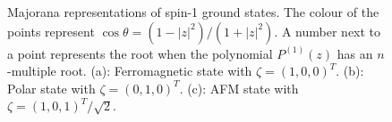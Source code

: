 \begin{figure}
    \centering
    \caption[Majorana representation of spin-1 ground states]
    {\label{fig: spin-1-majorana}Majorana representations of spin-1 ground
    states. The colour of the points represent \(\cos\theta =
    (1-|z|^2)/(1+|z|^2)\).
    A number next to a point represents the root when the polynomial
    \(P^{(1)}(z)\) has an \(n\)-multiple root.
    (a): Ferromagnetic state with \(\zeta={(1, 0, 0)}^T\).
    (b): Polar state with \(\zeta={(0, 1, 0)}^T\).
    (c): AFM state with \(\zeta={(1, 0, 1)}^T/\sqrt{2}\).}
\end{figure}

